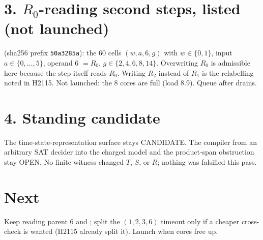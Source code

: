 \documentclass[11pt]{article}
\begin{document}
\section*{3. $R_0$-reading second steps, listed (not launched)}
 (sha256 prefix \texttt{50a3285a}): the 60 cells $(w,a,6,g)$ with $w\in\{0,1\}$, input $a\in\{0,\dots,5\}$, operand 6 $=R_0$, $g\in\{2,4,6,8,14\}$. Overwriting $R_0$ is admissible here because the step itself reads $R_0$. Writing $R_2$ instead of $R_1$ is the relabelling noted in H2115. Not launched: the 8 cores are full (load 8.9). Queue after  drains.

\section*{4. Standing candidate}
The time-state-representation surface stays CANDIDATE. The compiler from an arbitrary SAT decider into the charged model and the product-span obstruction stay OPEN. No finite witness changed $T$, $S$, or $R$; nothing was falsified this pass.

\section*{Next}
Keep reading parent 6 and ; split the $(1,2,3,6)$ timeout only if a cheaper cross-check is wanted (H2115 already split it). Launch  when cores free up.
\end{document}
